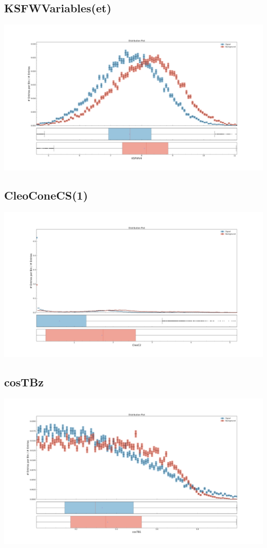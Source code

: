\documentclass[10pt,a4paper]{article}
\begin{document}
\subsection{KSFWVariables(et)}
\begin{center}
\includegraphics[width=1.0\textwidth]{variable_1627611668298853210.pdf}
\end{center}
\subsection{CleoConeCS(1)}
\begin{center}
\includegraphics[width=1.0\textwidth]{variable_4296370140092378655.pdf}
\end{center}
\subsection{cosTBz}
\begin{center}
\includegraphics[width=1.0\textwidth]{variable_6524522569690219926.pdf}
\end{center}
\end{document}
